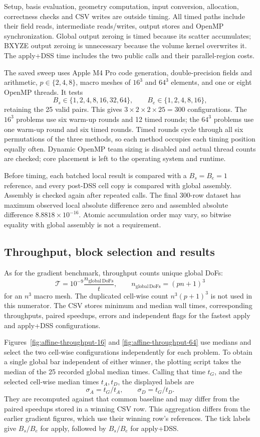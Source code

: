 \documentclass[11pt]{article}
\begin{document}
Setup, basis evaluation, geometry computation, input conversion, allocation,
correctness checks and CSV writes are outside timing. All timed paths include
their field reads, intermediate reads/writes, output stores and OpenMP
synchronization. Global output zeroing is timed because its scatter
accumulates; BXYZE output zeroing is unnecessary because the volume kernel
overwrites it. The apply+DSS time includes the two public calls and their
parallel-region costs.

The saved sweep uses Apple M4 Pro code generation, double-precision fields
and arithmetic, \(p\in\{2,4,8\}\), macro meshes of \(16^3\) and \(64^3\)
elements, and one or eight OpenMP threads. It tests
\[
 B_s\in\{1,2,4,8,16,32,64\},\qquad
 B_e\in\{1,2,4,8,16\},
\]
retaining the 25 valid pairs. This gives
\(3\times2\times2\times25=300\) configurations.
The \(16^3\) problems use six warm-up rounds and 12 timed rounds; the
\(64^3\) problems use one warm-up round and six timed rounds.
Timed rounds cycle through all six permutations of the three methods, so
each method occupies each timing position equally often.
Dynamic OpenMP team sizing is disabled and actual thread counts are checked;
core placement is left to the operating system and runtime.

Before timing, each batched local result is compared with a \(B_s=B_e=1\)
reference, and every post-DSS cell copy is compared with global assembly.
Assembly is checked again after repeated calls. The final 300-row dataset
has maximum observed local absolute difference zero and assembled absolute
difference \(8.8818\times10^{-16}\). Atomic accumulation order may vary, so
bitwise equality with global assembly is not a requirement.

\subsection{Throughput, block selection and results}

As for the gradient benchmark, throughput counts unique global DoFs:
\[
 \mathcal T=10^{-9}\frac{n_{\mathrm{global\,DoFs}}}{t},
 \qquad n_{\mathrm{global\,DoFs}}=(pn+1)^3
\]
for an \(n^3\) macro mesh. The duplicated cell-wise count \(n^3(p+1)^3\)
is not used in this numerator.
The CSV stores minimum and median wall times, corresponding throughputs,
paired speedups, errors and independent flags for the fastest apply and
apply+DSS configurations.

Figures~\ref{fig:affine-throughput-16} and
\ref{fig:affine-throughput-64} use medians and select the two cell-wise
configurations independently for each problem. To obtain a single global
bar independent of either winner, the plotting script takes the median of
the 25 recorded global median times. Calling that time \(t_G\), and the
selected cell-wise median times \(t_A,t_D\), the displayed labels are
\[
 \sigma_A=t_G/t_A,\qquad \sigma_D=t_G/t_D.
\]
They are recomputed against that common baseline and may differ from the
paired speedups stored in a winning CSV row. This aggregation differs from
the earlier gradient figures, which use their winning row's references.
The tick labels give \(B_s/B_e\) for apply, followed by \(B_s/B_e\) for
apply+DSS.
\end{document}
